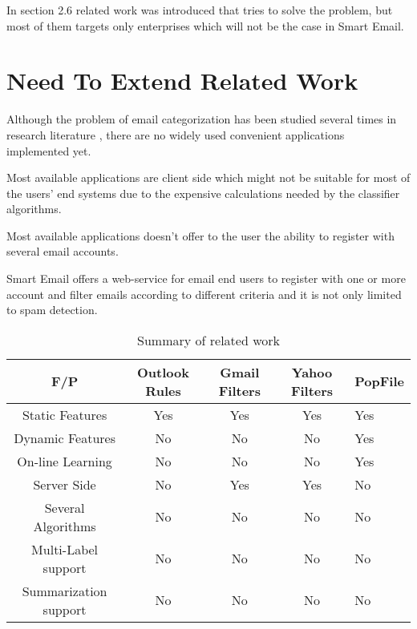 In section 2.6 related work was introduced that tries to solve the problem, but most of them targets only enterprises which will not be the case in Smart Email.

\section{Need To Extend Related Work}
\begin{my_itemize}
    \item Although the problem of email categorization has been studied several
    times in research literature , there are no widely used convenient
    applications implemented yet.
    \item Most available applications are client side which might not be
    suitable for most of the users' end systems due to the expensive calculations
    needed by the classifier algorithms.
    \item Most available applications doesn't offer to the user the ability to 
    register with several email accounts.
    \item Smart Email offers a web-service for email end users to register with
    one or more account and filter emails according to different criteria and
    it is not only limited to spam detection.
\end{my_itemize}

\begin{center}
  \begin{table}
    \begin{tabular}{ | c | c | c | c | p{2cm} |}
      \hline
      F/P              & Outlook Rules & Gmail Filters & Yahoo Filters & PopFile \cite{POPFILE} \\ \hline
      Static Features  &    Yes        &    Yes        &    Yes      &    Yes  \\ \hline     
      Dynamic Features &    No        &    No         &    No        &    Yes  \\ \hline
      On-line Learning &    No        &    No         &    No        &    Yes  \\ \hline
      Server Side      &    No        &    Yes        &    Yes       &    No   \\ \hline
      Several Algorithms &    No        &    No &    No       &    No   \\ \hline
      Multi-Label support &    No        &    No &    No       &    No   \\ \hline
      Summarization support&    No        &    No &    No       &    No   \\ \hline
    \end{tabular}
    \caption[Summary of related work]{Summary of related work}
  \end{table}
\end{center}  

